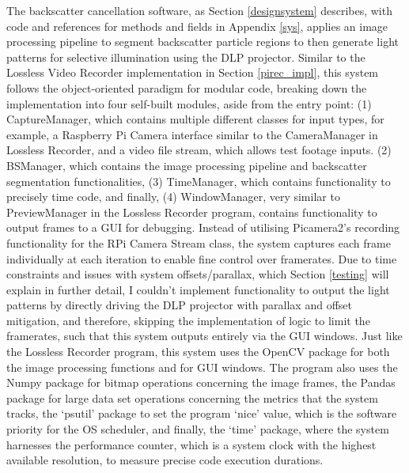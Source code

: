 The backscatter cancellation software, as Section \ref{designsystem} describes, with code and references for methods and fields in Appendix \ref{sys}, applies an image processing pipeline to segment backscatter particle regions to then generate light patterns for selective illumination using the DLP projector. Similar to the Lossless Video Recorder implementation in Section \ref{pirec_impl}, this system follows the object-oriented paradigm for modular code, breaking down the implementation into four self-built modules, aside from the entry point: (1) CaptureManager, which contains multiple different classes for input types, for example, a Raspberry Pi Camera interface similar to the CameraManager in Lossless Recorder, and a video file stream, which allows test footage inputs. (2) BSManager, which contains the image processing pipeline and backscatter segmentation functionalities, (3) TimeManager, which contains functionality to precisely time code, and finally, (4) WindowManager, very similar to PreviewManager in the Lossless Recorder program, contains functionality to output frames to a GUI for debugging. Instead of utilising Picamera2's recording functionality for the RPi Camera Stream class, the system captures each frame individually at each iteration to enable fine control over framerates.  Due to time constraints and issues with system offsets/parallax, which Section \ref{testing} will explain in further detail, I couldn't implement functionality to output the light patterns by directly driving the DLP projector with parallax and offset mitigation, and therefore, skipping the implementation of logic to limit the framerates, such that this system outputs entirely via the GUI windows. Just like the Lossless Recorder program, this system uses the OpenCV package for both the image processing functions and for GUI windows. The program also uses the Numpy package for bitmap operations concerning the image frames, the Pandas package for large data set operations concerning the metrics that the system tracks, the `psutil' package to set the program `nice' value, which is the software priority for the OS scheduler, and finally, the `time' package, where the system harnesses the performance counter, which is a system clock with the highest available resolution, to measure precise code execution durations.

